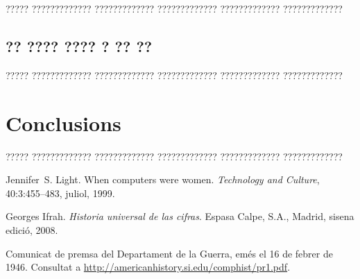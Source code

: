 \documentclass[11pt,english,listoffigures,listoftables]{tfgetsinf}
\begin{document}
\chapter{}

????? ????????????? ????????????? ????????????? ????????????? ????????????? 

\section{?? ???? ???? ? ?? ??}

????? ????????????? ????????????? ????????????? ????????????? ?????????????


\chapter{Conclusions}

????? ????????????? ????????????? ????????????? ????????????? ????????????? 


\begin{thebibliography}{10}

   Jennifer~S. Light.
   \newblock When computers were women.
   \newblock \textit{Technology and Culture}, 40:3:455--483, juliol, 1999.

   Georges Ifrah.
   \newblock \textit{Historia universal de las cifras}.
   \newblock Espasa Calpe, S.A., Madrid, sisena edició, 2008.

   Comunicat de premsa del Departament de la Guerra, 
   emés el 16 de febrer de 1946. 
   \newblock Consultat a 
   \url{http://americanhistory.si.edu/comphist/pr1.pdf}.

\end{thebibliography}
\cleardoublepage
\end{document}
